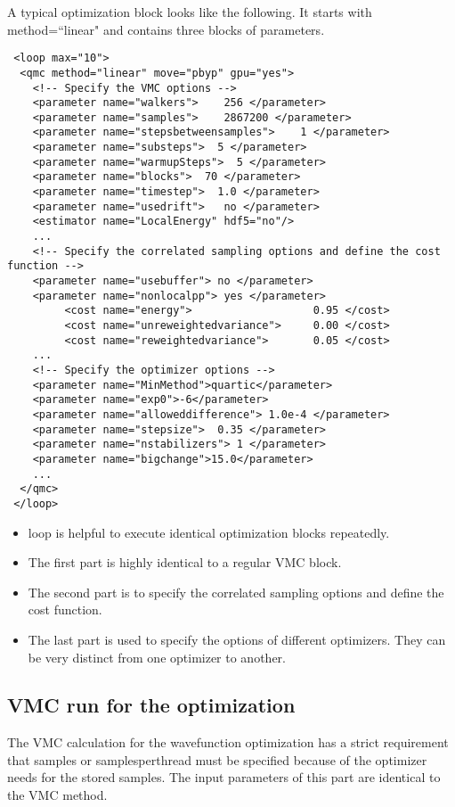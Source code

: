A typical optimization block looks like the following. It starts with method=``linear" and contains three blocks of parameters.
\begin{lstlisting}
 <loop max="10">
  <qmc method="linear" move="pbyp" gpu="yes">
    <!-- Specify the VMC options -->
    <parameter name="walkers">    256 </parameter>
    <parameter name="samples">    2867200 </parameter>
    <parameter name="stepsbetweensamples">    1 </parameter>
    <parameter name="substeps">  5 </parameter>
    <parameter name="warmupSteps">  5 </parameter>
    <parameter name="blocks">  70 </parameter>
    <parameter name="timestep">  1.0 </parameter>
    <parameter name="usedrift">   no </parameter>
    <estimator name="LocalEnergy" hdf5="no"/>
    ...
    <!-- Specify the correlated sampling options and define the cost function -->
    <parameter name="usebuffer"> no </parameter>
    <parameter name="nonlocalpp"> yes </parameter>
         <cost name="energy">                   0.95 </cost>
         <cost name="unreweightedvariance">     0.00 </cost>
         <cost name="reweightedvariance">       0.05 </cost>
    ...
    <!-- Specify the optimizer options -->
    <parameter name="MinMethod">quartic</parameter>
    <parameter name="exp0">-6</parameter>
    <parameter name="alloweddifference"> 1.0e-4 </parameter>
    <parameter name="stepsize">  0.35 </parameter>
    <parameter name="nstabilizers"> 1 </parameter>
    <parameter name="bigchange">15.0</parameter>
    ...
  </qmc>
 </loop>
\end{lstlisting}
\begin{itemize}
\item loop is helpful to execute identical optimization blocks repeatedly.
\item The first part is highly identical to a regular VMC block.
\item The second part is to specify the correlated sampling options and define the cost function.
\item The last part is used to specify the options of different optimizers. They can be very distinct from one optimizer to another.
\end{itemize}

\subsection{VMC run for the optimization}
The VMC calculation for the wavefunction optimization has a strict requirement 
that samples or samplesperthread must be specified because of the optimizer needs for the stored samples.
The input parameters of this part are identical to the VMC method.

